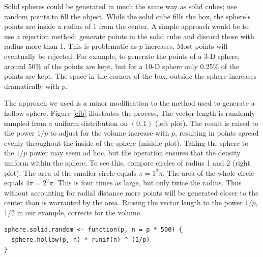\documentclass[article]{jss}
\begin{document}
Solid spheres could be generated in much the same way as solid cubes; use
random points to fill the object. While the solid cube fills the box,
the sphere's points are inside a radius of 1 from the center. A simple
approach would be to use a rejection method: generate points in the
solid cube and discard those with radius more than 1. This is
problematic as $p$ increases. Most points will eventually be rejected.
For example, to generate the points of a 3-D sphere, around 50\% of
the points are kept, but for a 10-D sphere only 0.25\% of the points
are kept. The space in the corners of the box, outside the sphere
increases dramatically with $p$.

The approach we used is a minor modification to the method used to
generate a hollow sphere. Figure \ref{cfb} illustrates the
process. The vector length is randomly sampled from a uniform
distribution on $(0,1)$ (left plot). The result is raised to the power
$1/p$ to adjust for the volume increase with $p$, resulting in points
spread evenly throughout the inside of the sphere (middle plot).
Taking the sphere to the $1/p$ power may seem ad hoc, but the
operation ensures that the density uniform within the sphere. To see
this, compare circles of radius 1 and 2 (right plot).  The area of the
smaller circle equals $\pi =  1^2\pi $.  The area of the whole
circle equals $ 4 \pi = 2^2 \pi $. This is four times as large, but
only twice the radius.  Thus without accounting for radial distance
more points will be generated closer to the center than is warranted
by the area.  Raising the vector length to the power $1/p$, 1/2 in our
example, corrects for the volume.

\begin{verbatim}
sphere.solid.random <- function(p, n = p * 500) {
  sphere.hollow(p, n) * runif(n) ^ (1/p)
}
\end{verbatim}
\end{document}
